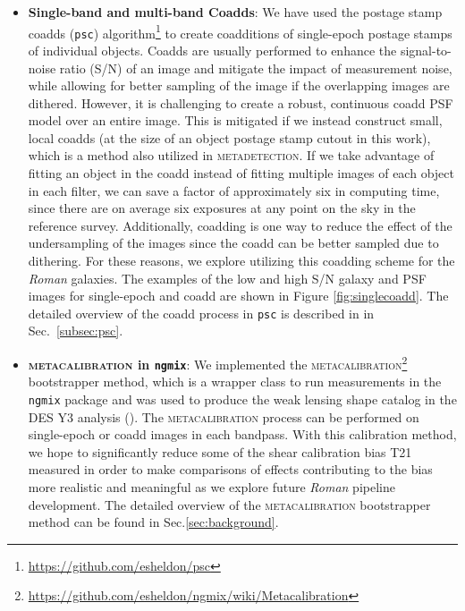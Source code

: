 \documentclass[fleqn,usenatbib]{mnras}
\begin{document}
\begin{itemize}
    \item \textbf{Single-band and multi-band Coadds}: 
    We have used the postage stamp coadds (\texttt{psc}) algorithm\footnote{\url{https://github.com/esheldon/psc}} to create coadditions of single-epoch postage stamps of individual objects. Coadds are usually performed to enhance the signal-to-noise ratio (S/N) of an image and mitigate the impact of measurement noise, while allowing for better sampling of the image if the overlapping images are dithered. However, it is challenging to create a robust, continuous coadd PSF model over an entire image. This is mitigated if we instead construct small, local coadds (at the size of an object postage stamp cutout in this work), which is a method also utilized in \textsc{metadetection}. If we take advantage of fitting an object in the coadd instead of fitting multiple images of each object in each filter, we can save a factor of approximately six in computing time, since there are on average six exposures at any point on the sky in the reference survey. Additionally, coadding is one way to reduce the effect of the undersampling of the images since the coadd can be better sampled due to dithering. For these reasons, we explore utilizing this coadding scheme for the \emph{Roman} galaxies. The examples of the low and high S/N galaxy and PSF images for single-epoch and coadd are shown in Figure \ref{fig:singlecoadd}. The detailed overview of the coadd process in \texttt{psc} is described in in Sec.~\ref{subsec:psc}.
    
    \item \textbf{\textsc{metacalibration} in \texttt{ngmix}}: We implemented the \textsc{metacalibration}\footnote{\url{https://github.com/esheldon/ngmix/wiki/Metacalibration}} bootstrapper method, which is a wrapper class to run measurements in the \texttt{ngmix} package and was used to produce the weak lensing shape catalog in the DES Y3 analysis (\citealt{2020arXiv201103408G}). The \textsc{metacalibration} process can be performed on single-epoch or coadd images in each bandpass. With this calibration method, we hope to significantly reduce some of the shear calibration bias T21 measured in order to make comparisons of effects contributing to the bias more realistic and meaningful as we explore future \emph{Roman} pipeline development. The detailed overview of the \textsc{metacalibration} bootstrapper method can be found in Sec.\ref{sec:background}. 
\end{itemize}
\end{document}
